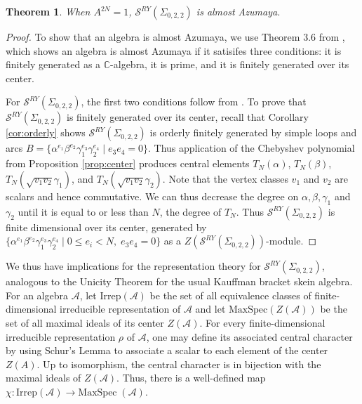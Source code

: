 \documentclass{article}
\newcommand{\C}{\mathbb{C}}
\renewcommand{\a}{\alpha}
\renewcommand{\b}{\beta}
\newcommand{\g}{\gamma}
\newcommand{\san}{\Sigma_{0,2,2}}
\newtheorem{theorem}{Theorem}[section]
\theoremstyle{definition}
\renewcommand{\g}{\gamma}
\renewcommand{\a}{\alpha}
\renewcommand{\b}{\beta}
\renewcommand{\san}{\Sigma_{0, 2, 2}}
\begin{document}
\begin{theorem}
When $A^{2N}=1$, $\mathcal S^{RY}(\san)$ is almost Azumaya.  
\end{theorem} 
%
\begin{proof}
To show that an algebra is almost Azumaya, we use Theorem 3.6 from \cite{FKBLUnicity}, which shows an algebra is almost Azumaya if it satisifes three conditions:  it is finitely generated as a $\C$-algebra,  it is prime, and  it is finitely generated over its center.   

For $\mathcal S^{RY}(\san)$, the first two conditions follow from \cite{BobbPeiferFinGen, MoonWongComp, BKLQTrace}.   
To prove that $\mathcal S^{RY}(\san)$ is finitely generated over its center, recall that Corollary \ref{cor:orderly} shows $\mathcal S^{RY}(\san)$ is orderly finitely generated by simple loops and arcs $B=\{\a^{e_1}\b^{e_2}\g_1^{e_3}\g_2^{e_4}\mid e_3e_4=0\}$.  Thus application of the Chebyshev polynomial from Proposition \ref{prop:center} produces central elements $T_N(\alpha)$, $T_N(\beta)$, $T_N(\sqrt{v_1v_2} \gamma_1)$, and $ T_N(\sqrt{v_1v_2} \gamma_2)$.   Note that the vertex classes $v_1$ and $v_2$ are scalars and hence commutative.  We can thus decrease the degree on $\a, \b, \g_1$ and $\g_2$ until it is equal to or less than $N$,  the degree of $T_N$.  Thus $\mathcal S^{RY}(\san)$ is finite dimensional over its center,  generated by $\{ \a^{e_1}\b^{e_2}\g_1^{e_3}\g_2^{e_4}\mid   0 \le e_i < N, \; e_3e_4=0\}$ as a $Z(\mathcal S^{RY}(\san))$-module. 

 \end{proof}

We thus have implications for the representation theory for $\mathcal S^{RY}(\san)$, analogous to the Unicity Theorem for the usual Kauffman bracket skein algebra.  For an algebra $\mathcal{A}$, let   $\mathrm{Irrep}(\mathcal{A})$ be the set of all equivalence classes of finite-dimensional irreducible representation of $\mathcal{A}$ and let $\mathrm{MaxSpec}(Z(\mathcal{A}))$ be the set of all maximal ideals of its center $Z(\mathcal{A})$.   For every finite-dimensional irreducible representation $\rho$ of $\mathcal{A}$, one may define its associated central character by using Schur's Lemma to associate a scalar to each element of the center $Z(A)$.  Up to isomorphism, the central character is in bijection with the maximal ideals of $Z(\mathcal{A})$.  Thus, there is a well-defined map  $\chi: \mathrm{Irrep}(\mathcal{A}) \to  \mathrm{MaxSpec}\;(\mathcal{A})$. 

\end{document}
